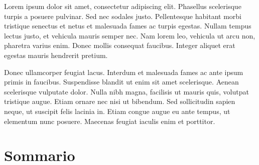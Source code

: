 Lorem ipsum dolor sit amet, consectetur adipiscing elit. Phasellus scelerisque turpis a posuere pulvinar. Sed nec sodales justo. Pellentesque habitant morbi tristique senectus et netus et malesuada fames ac turpis egestas. Nullam tempus lectus justo, et vehicula mauris semper nec. Nam lorem leo, vehicula ut arcu non, pharetra varius enim. Donec mollis consequat faucibus. Integer aliquet erat egestas mauris hendrerit pretium.

Donec ullamcorper feugiat lacus. Interdum et malesuada fames ac ante ipsum primis in faucibus. Suspendisse blandit ut enim sit amet scelerisque. Aenean scelerisque vulputate dolor. Nulla nibh magna, facilisis ut mauris quis, volutpat tristique augue. Etiam ornare nec nisi ut bibendum. Sed sollicitudin sapien neque, ut suscipit felis lacinia in. Etiam congue augue eu ante tempus, ut elementum nunc posuere. Maecenas feugiat iaculis enim et porttitor.

\chapter*{Sommario}

